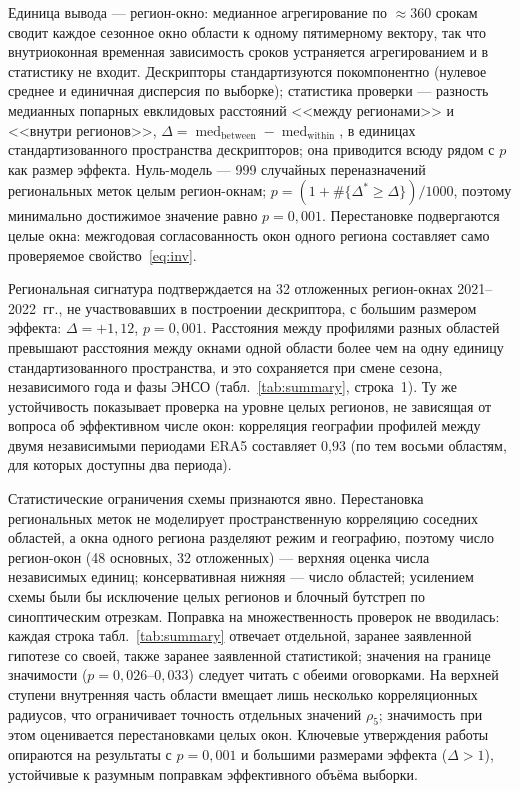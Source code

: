 \documentclass[11pt,a4paper]{article}
\begin{document}
Единица вывода --- регион-окно: медианное агрегирование по ${\approx}360$ срокам сводит каждое сезонное окно области к одному пятимерному вектору, так что внутриоконная временная зависимость сроков устраняется агрегированием и в статистику не входит. Дескрипторы стандартизуются покомпонентно (нулевое среднее и единичная дисперсия по выборке); статистика проверки --- разность медианных попарных евклидовых расстояний <<между регионами>> и <<внутри регионов>>, $\Delta=\operatorname{med}_{\mathrm{between}}-\operatorname{med}_{\mathrm{within}}$, в единицах стандартизованного пространства дескрипторов; она приводится всюду рядом с $p$ как размер эффекта. Нуль-модель --- 999 случайных переназначений региональных меток целым регион-окнам; $p=(1+\#\{\Delta^*\ge\Delta\})/1000$, поэтому минимально достижимое значение равно $p=0{,}001$. Перестановке подвергаются целые окна: межгодовая согласованность окон одного региона составляет само проверяемое свойство~\eqref{eq:inv}.

Региональная сигнатура подтверждается на 32 отложенных регион-окнах 2021--2022~гг., не участвовавших в построении дескриптора, с большим размером эффекта: $\Delta=+1{,}12$, $p=0{,}001$. Расстояния между профилями разных областей превышают расстояния между окнами одной области более чем на одну единицу стандартизованного пространства, и это сохраняется при смене сезона, независимого года и фазы ЭНСО (табл.~\ref{tab:summary}, строка~1). Ту же устойчивость показывает проверка на уровне целых регионов, не зависящая от вопроса об эффективном числе окон: корреляция географии профилей между двумя независимыми периодами ERA5 составляет 0,93 (по тем восьми областям, для которых доступны два периода).

Статистические ограничения схемы признаются явно. Перестановка региональных меток не моделирует пространственную корреляцию соседних областей, а окна одного региона разделяют режим и географию, поэтому число регион-окон (48 основных, 32 отложенных) --- верхняя оценка числа независимых единиц; консервативная нижняя --- число областей; усилением схемы были бы исключение целых регионов и блочный бутстреп по синоптическим отрезкам. Поправка на множественность проверок не вводилась: каждая строка табл.~\ref{tab:summary} отвечает отдельной, заранее заявленной гипотезе со своей, также заранее заявленной статистикой; значения на границе значимости ($p=0{,}026$--$0{,}033$) следует читать с обеими оговорками. На верхней ступени внутренняя часть области вмещает лишь несколько корреляционных радиусов, что ограничивает точность отдельных значений $\rho_5$; значимость при этом оценивается перестановками целых окон. Ключевые утверждения работы опираются на результаты с $p=0{,}001$ и большими размерами эффекта ($\Delta>1$), устойчивые к разумным поправкам эффективного объёма выборки.
\end{document}

